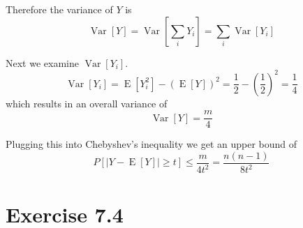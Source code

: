 \documentclass[10pt,a4paper]{article}
\DeclareMathOperator{\E}{E}
\DeclareMathOperator{\Var}{Var}
\begin{document}
Therefore the variance of $Y$ is
\begin{equation*}
  \Var[Y] = \Var\left[ \sum_{i} Y_{i} \right] = \sum_{i} \Var[Y_{i}]
\end{equation*}

Next we examine $\Var[Y_{i}]$.
\begin{equation*}
  \Var[Y_{i}] = \E[Y_{i}^{2}] - (\E[Y])^{2} = \frac{1}{2} - \left( \frac{1}{2} \right)^{2} = \frac{1}{4}
\end{equation*}
which results in an overall variance of
\begin{equation*}
  \Var[Y] = \frac{m}{4}
\end{equation*}

Plugging this into Chebyshev's inequality we get an upper bound of
\begin{equation*}
  P\left[ |Y - \E[Y]| \ge t \right] \le \frac{m}{4t^{2}} = \frac{n(n - 1)}{8t^{2}}
\end{equation*}

\section*{Exercise 7.4}
\end{document}
